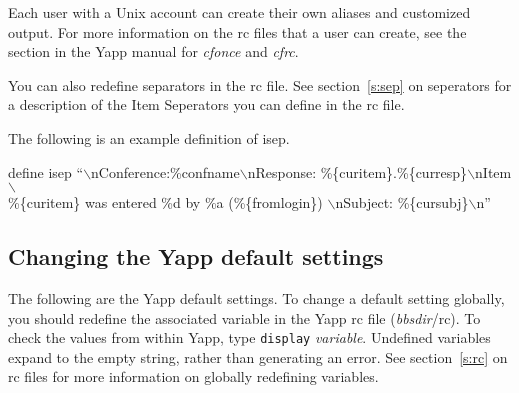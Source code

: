 \documentclass[twoside]{report}
\begin{document}
      Each user with a Unix account can create their own aliases and customized 
      output. For more information on the rc files that a user can create, 
      see the section in the Yapp manual for {\em cfonce} and 
      {\em cfrc}.

      You can also redefine separators in the rc file.  See section~\ref{s:sep}
      on seperators for a description of the Item Seperators you can define 
      in the rc file.

      The following is an example definition of isep.

\qquad define isep ``$\backslash$nConference:\%{confname}$\backslash$nResponse: \%\{curitem\}.\%\{curresp\}$\backslash$nItem$\backslash$ \\
\qquad \%\{curitem\} was entered \%d by \%a  (\%\{fromlogin\}) $\backslash$nSubject: \%\{cursubj\}$\backslash$n''

      \subsection{Changing the Yapp default settings} \label{s:var}
      The following are the Yapp default settings.  To change a
      default setting globally, you should redefine the associated variable
      in the Yapp rc file ({\em bbsdir}/rc).  To check the values from within 
      Yapp, type {\tt display} {\em variable}.  Undefined variables expand to 
      the empty string, rather than generating an error.  See 
      section~\ref{s:rc} on rc files for more information on globally 
      redefining variables.
\end{document}
